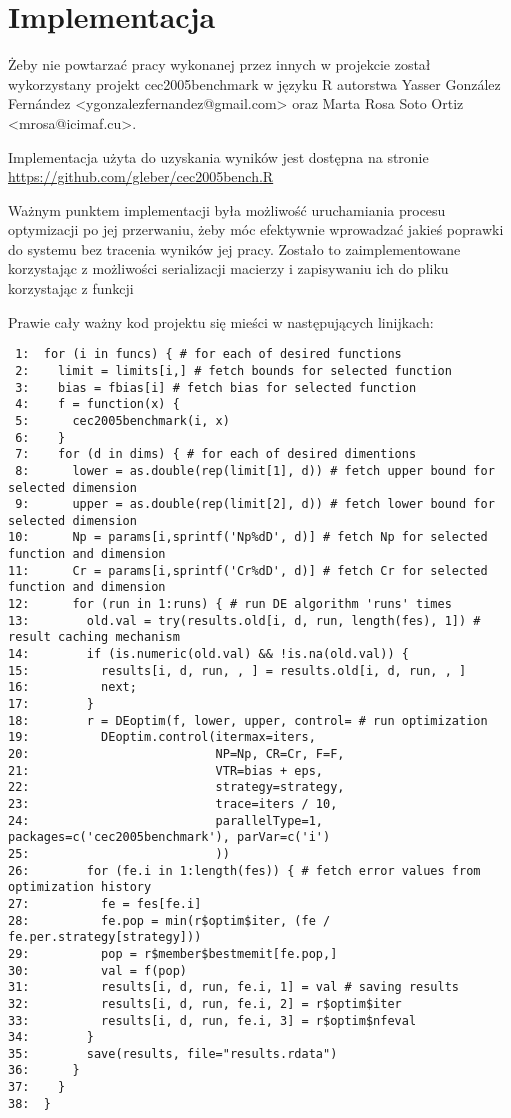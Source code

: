 \documentclass[11pt]{article}
\begin{document}
\section{Implementacja}
\label{sec-3}


Żeby nie powtarzać pracy wykonanej przez innych w projekcie został
wykorzystany projekt cec2005benchmark w języku R autorstwa Yasser
González Fernández <ygonzalezfernandez@gmail.com> oraz Marta Rosa Soto
Ortiz <mrosa@icimaf.cu>.

Implementacja użyta do uzyskania wyników jest dostępna na stronie
\href{https://github.com/gleber/cec2005bench.R}{https://github.com/gleber/cec2005bench.R}

Ważnym punktem implementacji była możliwość uruchamiania procesu
optymizacji po jej przerwaniu, żeby móc efektywnie wprowadzać jakieś
poprawki do systemu bez tracenia wyników jej pracy. Zostało to
zaimplementowane korzystając z możliwości serializacji macierzy i
zapisywaniu ich do pliku korzystając z funkcji 

Prawie cały ważny kod projektu się mieści w następujących linijkach:


\begin{verbatim}
 1:  for (i in funcs) { # for each of desired functions
 2:    limit = limits[i,] # fetch bounds for selected function
 3:    bias = fbias[i] # fetch bias for selected function
 4:    f = function(x) {
 5:      cec2005benchmark(i, x)
 6:    }
 7:    for (d in dims) { # for each of desired dimentions
 8:      lower = as.double(rep(limit[1], d)) # fetch upper bound for selected dimension
 9:      upper = as.double(rep(limit[2], d)) # fetch lower bound for selected dimension
10:      Np = params[i,sprintf('Np%dD', d)] # fetch Np for selected function and dimension
11:      Cr = params[i,sprintf('Cr%dD', d)] # fetch Cr for selected function and dimension
12:      for (run in 1:runs) { # run DE algorithm 'runs' times
13:        old.val = try(results.old[i, d, run, length(fes), 1]) # result caching mechanism
14:        if (is.numeric(old.val) && !is.na(old.val)) {
15:          results[i, d, run, , ] = results.old[i, d, run, , ]
16:          next;
17:        }
18:        r = DEoptim(f, lower, upper, control= # run optimization
19:          DEoptim.control(itermax=iters,
20:                          NP=Np, CR=Cr, F=F,
21:                          VTR=bias + eps,
22:                          strategy=strategy,
23:                          trace=iters / 10,
24:                          parallelType=1, packages=c('cec2005benchmark'), parVar=c('i') 
25:                          ))
26:        for (fe.i in 1:length(fes)) { # fetch error values from optimization history
27:          fe = fes[fe.i]
28:          fe.pop = min(r$optim$iter, (fe / fe.per.strategy[strategy]))
29:          pop = r$member$bestmemit[fe.pop,]
30:          val = f(pop)
31:          results[i, d, run, fe.i, 1] = val # saving results
32:          results[i, d, run, fe.i, 2] = r$optim$iter
33:          results[i, d, run, fe.i, 3] = r$optim$nfeval
34:        }
35:        save(results, file="results.rdata")
36:      }
37:    }
38:  }
\end{verbatim}
\end{document}
